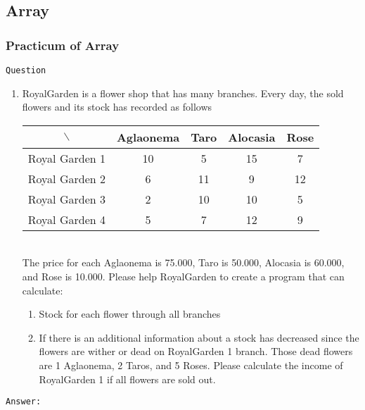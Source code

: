 \documentclass[12pt,titlepage]{article}
\begin{document}
\newpage

\subsection{Array}

\subsubsection{Practicum of Array}

\texttt{Question}

\begin{enumerate}
    \item RoyalGarden is a flower shop that has many branches. Every day, the sold flowers and its stock has recorded as follows \mbox{}\\
    \begin{tabular}{|c|c|c|c|c|}
        \hline
        $\backslash$ & Aglaonema & Taro & Alocasia & Rose \\
        \hline
        Royal Garden 1 & 10 & 5 & 15 & 7 \\
        \hline
        Royal Garden 2 & 6 & 11 & 9 & 12 \\
        \hline
        Royal Garden 3 & 2 & 10 & 10 & 5 \\
        \hline
        Royal Garden 4 & 5 & 7 & 12 & 9 \\
        \hline
    \end{tabular} \mbox{}\\
    The price for each Aglaonema is 75.000, Taro is 50.000, Alocasia is 60.000, and Rose is 10.000. Please help RoyalGarden to create a program that can calculate:
    \begin{enumerate}
        \item Stock for each flower through all branches
        \item If there is an additional information about a stock has decreased since the flowers are wither or dead on RoyalGarden 1 branch. Those dead flowers are 1 Aglaonema, 2 Taros, and 5 Roses. Please calculate the income of RoyalGarden 1 if all flowers are sold out.
    \end{enumerate}
\end{enumerate}

\texttt{Answer: }
\end{document}
